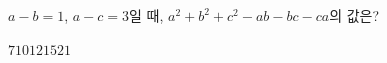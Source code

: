 $a-b=1$, $a-c=3$일 때, $a^2+b^2+c^2-ab-bc-ca$의 값은?
\begin{choices32}{$7$}{$10$}{$12$}{$15$}{$21$}\end{choices32}
